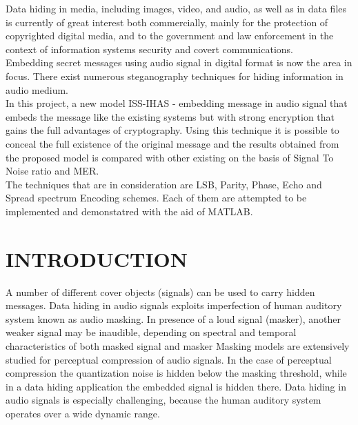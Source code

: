 \documentclass[a4paper, 12pt, notitlepage]{report}
\begin{document}
Data hiding in media, including images, video, and audio, as well as in data files is currently of great interest both commercially, mainly for the protection of copyrighted digital media, and to the government and law enforcement in the context of information systems security and covert communications.\\

Embedding secret messages using audio signal in digital format is now  the  area  in  focus.  There  exist  numerous  steganography techniques for hiding information in audio medium.\\

In  this project,  a  new  model  ISS-IHAS  -  embedding message in audio signal that embeds the message like the existing systems but  with  strong  encryption  that  gains  the  full  advantages  of cryptography.  Using  this technique  it  is  possible  to  conceal  the full  existence  of  the  original  message  and  the  results  obtained  from the  proposed  model  is  compared  with  other  existing on the basis of Signal To Noise ratio and MER.\\
  
The techniques that are in consideration are LSB, Parity, Phase, Echo and Spread spectrum Encoding schemes. Each of them are attempted to be implemented and demonstatred with the aid of MATLAB.

\tableofcontents
\listoffigures 


\chapter{INTRODUCTION}

A number of different cover objects (signals) can be used to carry hidden messages. Data hiding in audio signals exploits imperfection of human auditory system known as audio masking. In presence of a loud signal (masker), another weaker signal may be inaudible, depending on spectral and temporal characteristics of both masked signal and masker Masking models are extensively studied for perceptual compression of audio signals. In the case of perceptual compression the quantization noise is hidden below the masking threshold, while in a data hiding application the embedded signal is hidden there. Data hiding in audio signals is especially challenging, because the human auditory system operates over a wide dynamic range. \\
\end{document}
